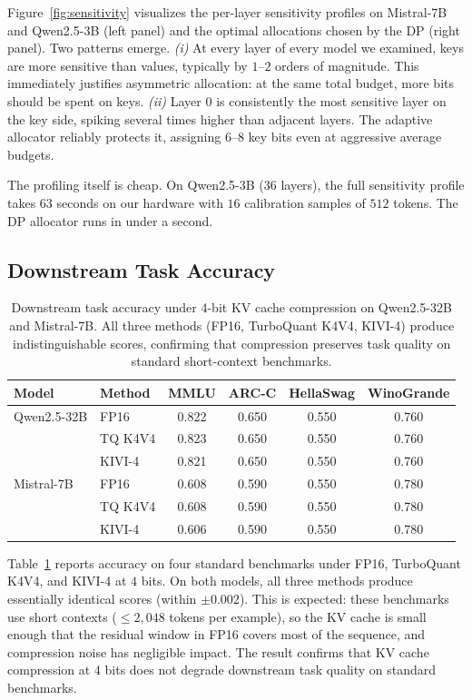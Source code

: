 \documentclass[11pt]{article}
\begin{document}
Figure~\ref{fig:sensitivity} visualizes the per-layer sensitivity profiles on Mistral-7B and Qwen2.5-3B (left panel) and the optimal allocations chosen by the DP (right panel). Two patterns emerge. \emph{(i)} At every layer of every model we examined, keys are more sensitive than values, typically by $1$--$2$ orders of magnitude. This immediately justifies asymmetric allocation: at the same total budget, more bits should be spent on keys. \emph{(ii)} Layer $0$ is consistently the most sensitive layer on the key side, spiking several times higher than adjacent layers. The adaptive allocator reliably protects it, assigning $6$--$8$ key bits even at aggressive average budgets.

The profiling itself is cheap. On Qwen2.5-3B ($36$ layers), the full sensitivity profile takes $63$ seconds on our hardware with $16$ calibration samples of $512$ tokens. The DP allocator runs in under a second.

\subsection{Downstream Task Accuracy}
\label{sec:downstream}

\begin{table}[t]
\centering
\caption{Downstream task accuracy under 4-bit KV cache compression on Qwen2.5-32B and Mistral-7B. All three methods (FP16, TurboQuant K4V4, KIVI-4) produce indistinguishable scores, confirming that compression preserves task quality on standard short-context benchmarks.}
\label{tab:downstream}
\small
\begin{tabular}{l l c c c c}
\toprule
Model & Method & MMLU & ARC-C & HellaSwag & WinoGrande \\
\midrule
Qwen2.5-32B & FP16 & 0.822 & 0.650 & 0.550 & 0.760 \\
 & TQ K4V4 & 0.823 & 0.650 & 0.550 & 0.760 \\
 & KIVI-4 & 0.821 & 0.650 & 0.550 & 0.760 \\
\midrule
Mistral-7B & FP16 & 0.608 & 0.590 & 0.550 & 0.780 \\
 & TQ K4V4 & 0.608 & 0.590 & 0.550 & 0.780 \\
 & KIVI-4 & 0.606 & 0.590 & 0.550 & 0.780 \\
\bottomrule
\end{tabular}

\end{table}

Table~\ref{tab:downstream} reports accuracy on four standard benchmarks under FP16, TurboQuant K4V4, and KIVI-4 at $4$ bits. On both models, all three methods produce essentially identical scores (within $\pm 0.002$). This is expected: these benchmarks use short contexts ($\le 2{,}048$ tokens per example), so the KV cache is small enough that the residual window in FP16 covers most of the sequence, and compression noise has negligible impact. The result confirms that KV cache compression at $4$ bits does not degrade downstream task quality on standard benchmarks.
\end{document}
